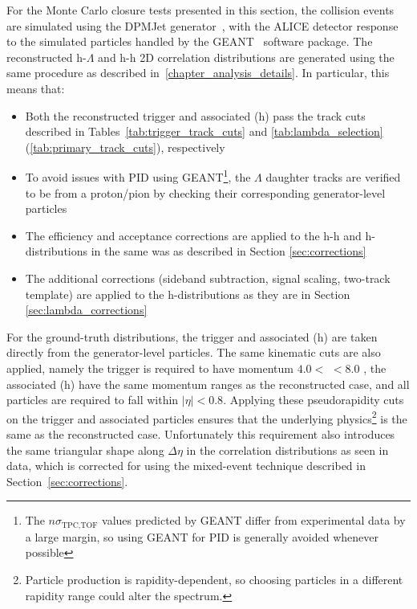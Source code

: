 For the Monte Carlo closure tests presented in this section, the \pPb collision events are simulated using the DPMJet generator~\cite{DPMJet}, with the ALICE detector response to the simulated particles handled by the GEANT~\cite{GEANT} software package. The reconstructed h-$\Lambda$ and h-h 2D correlation distributions are generated using the same procedure as described in~\ref{chapter_analysis_details}. In particular, this means that:
%
\begin{itemize}
    \item Both the reconstructed trigger and associated \lmb (h) pass the track cuts described in Tables~\ref{tab:trigger_track_cuts} and \ref{tab:lambda_selection} (\ref{tab:primary_track_cuts}), respectively 
    \item To avoid issues with PID using GEANT\footnote{The $n\sigma_{\text{TPC},\text{TOF}}$ values predicted by GEANT differ from experimental data by a large margin, so using GEANT for PID is generally avoided whenever possible}, the $\Lambda$ daughter tracks are verified to be from a proton/pion by checking their corresponding generator-level particles
    \item The efficiency and acceptance corrections are applied to the h-h and h-\lmb distributions in the same was as described in Section \ref{sec:corrections}
    \item The additional corrections (sideband subtraction, signal scaling, two-track template) are applied to the h-\lmb distributions as they are in Section \ref{sec:lambda_corrections}
\end{itemize}
%
For the ground-truth distributions, the trigger and associated \lmb (h) are taken directly from the generator-level particles. The same kinematic cuts are also applied, namely the trigger is required to have momentum $4.0 <$ \pt $< 8.0$ \GeVc, the associated \lmb (h) have the same momentum ranges as the reconstructed case, and all particles are required to fall within $|\eta| < 0.8$. Applying these pseudorapidity cuts on the trigger and associated particles ensures that the underlying physics\footnote{Particle production is rapidity-dependent, so choosing particles in a different rapidity range could alter the spectrum.} is the same as the reconstructed case. Unfortunately this requirement also introduces the same triangular shape along $\Delta\eta$ in the correlation distributions as seen in data, which is corrected for using the mixed-event technique described in Section~\ref{sec:corrections}.

